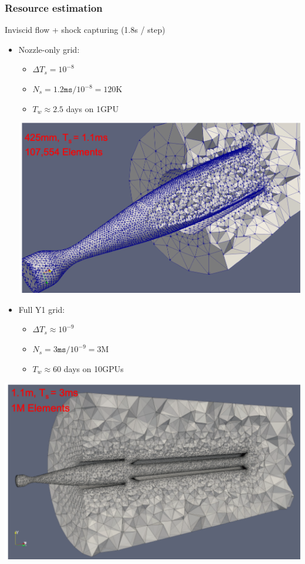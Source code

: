 \begin{frame}\frametitle{Resource estimation}
\begin{center}
Inviscid flow + shock capturing (1.8s / step)
\end{center}
\begin{multicols}{2}
\begin{itemize}
\item Nozzle-only grid:
\begin{itemize}
\item $\Delta{T_s} = 10^{-8}$
\item $N_s = 1.2\mathtt{ms} / 10^{-8} =  120$K
\item $T_w \approx 2.5$ days on 1GPU
\end{itemize}
\hspace{-20pt}\includegraphics[width=.45\textwidth]{figures/nozzlegrid_annotated2.png}
\columnbreak
\item Full Y1 grid:
\begin{itemize}
\item $\Delta{T_s} \approx 10^{-9}$
\item $N_s = 3\mathtt{ms} / 10^{-9} = 3$M
\item $T_w \approx 60$ days on 10GPUs
\end{itemize}
\end{itemize}
\hspace{5pt}\includegraphics[width=.45\textwidth]{figures/y1grid_annotated.png}
\end{multicols}
\end{frame}


